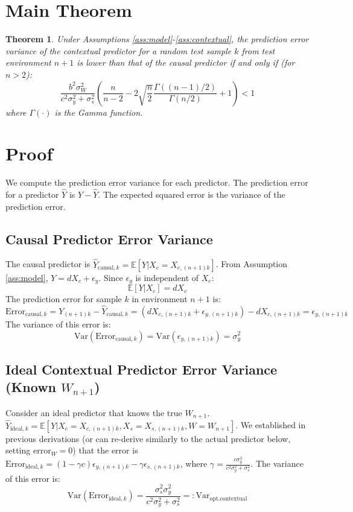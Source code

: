 \documentclass{article}
\theoremstyle{plain}
\newtheorem{theorem}{Theorem}[section]
\theoremstyle{definition}
\theoremstyle{remark}
\newcommand{\E}{\mathbb{E}}
\newcommand{\Var}{\text{Var}}
\newcommand{\g}{\Gamma} %
\begin{document}
\section{Main Theorem}

\begin{theorem}\label{thm:main_revised}
Under Assumptions \ref{ass:model}-\ref{ass:contextual}, the prediction error variance of the contextual predictor for a random test sample $k$ from test environment $n+1$ is lower than that of the causal predictor if and only if (for $n>2$):
\begin{equation} \label{eq:condition_revised}
\frac{b^2 \sigma_W^2}{c^2\sigma_y^2 + \sigma_s^2} \left( \frac{n}{n-2} - 2 \sqrt{\frac{n}{2}} \frac{\g((n-1)/2)}{\g(n/2)} + 1 \right) < 1
\end{equation}
where $\g(\cdot)$ is the Gamma function.
\end{theorem}

\section{Proof}

We compute the prediction error variance for each predictor. The prediction error for a predictor $\hat{Y}$ is $Y - \hat{Y}$. The expected squared error is the variance of the prediction error.

\subsection{Causal Predictor Error Variance}
The causal predictor is $\hat{Y}_{\text{causal}, k} = \E[Y | X_c = X_{c,(n+1)k}]$.
From Assumption \ref{ass:model}, $Y = dX_c + \epsilon_y$. Since $\epsilon_y$ is independent of $X_c$:
\[ \E[Y | X_c] = dX_c \]
The prediction error for sample $k$ in environment $n+1$ is:
\[ \text{Error}_{\text{causal}, k} = Y_{(n+1)k} - \hat{Y}_{\text{causal}, k} = (dX_{c,(n+1)k} + \epsilon_{y,(n+1)k}) - dX_{c,(n+1)k} = \epsilon_{y,(n+1)k} \]
The variance of this error is:
\begin{equation} \label{eq:var_causal_proof}
\Var(\text{Error}_{\text{causal}, k}) = \Var(\epsilon_{y,(n+1)k}) = \sigma_y^2
\end{equation}

\subsection{Ideal Contextual Predictor Error Variance (Known $W_{n+1}$)}
Consider an ideal predictor that knows the true $W_{n+1}$.
$\hat{Y}_{\text{ideal}, k} = \E[Y | X_c=X_{c,(n+1)k}, X_s=X_{s,(n+1)k}, W=W_{n+1}]$.
We established in previous derivations (or can re-derive similarly to the actual predictor below, setting $\text{error}_W=0$) that the error is $\text{Error}_{\text{ideal}, k} = (1 - \gamma c)\epsilon_{y,(n+1)k} - \gamma \epsilon_{s,(n+1)k}$, where $\gamma = \frac{c\sigma_y^2}{c^2\sigma_y^2 + \sigma_s^2}$.
The variance of this error is:
\begin{equation} \label{eq:var_ideal_contextual_proof}
\Var(\text{Error}_{\text{ideal}, k}) = \frac{\sigma_s^2 \sigma_y^2}{c^2\sigma_y^2 + \sigma_s^2} =: \Var_{\text{opt}, \text{contextual}}
\end{equation}
\end{document}
